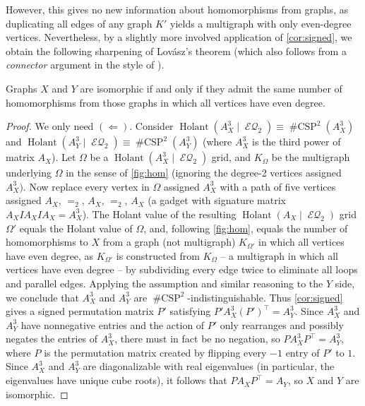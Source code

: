 \documentclass{theoretics}
\DeclareMathOperator{\holant}{Holant}
\DeclareMathOperator{\csp}{\#CSP}
\DeclareMathOperator{\eq}{\mathcal{EQ}}
\begin{document}
However, this gives no new information about homomorphisms from graphs, as
duplicating all edges of any graph $K'$ yields a multigraph with 
only even-degree vertices. Nevertheless, by a slightly more involved application of 
\autoref{cor:signed}, we obtain the following sharpening of Lovász's theorem (which also
follows from a \emph{connector} argument in the style of \cite{dvorak_recognizing_2010}).
\begin{corollary}
    Graphs $X$ and $Y$ are isomorphic if and only if they admit the same number of homomorphisms
    from those graphs in which all vertices have even degree.
\end{corollary}
\begin{proof}
    We only need $(\Longleftarrow)$. Consider
    $\holant(A_X^3 \mid \eq_2) \equiv \csp^2(A_X^3)$ and
    $\holant(A_Y^3 \mid \eq_2) \equiv \csp^2(A_Y^3)$ (where $A_X^3$ is the third power of
    matrix $A_X$). Let $\Omega$ be a
    $\holant(A_X^3 \mid \eq_2)$ grid, and $K_\Omega$ be the multigraph underlying $\Omega$ in
    the sense of \autoref{fig:hom} (ignoring the degree-2 vertices assigned $A_X^3)$.
    Now replace every vertex in $\Omega$ assigned $A_X^3$ with a path of five vertices 
    assigned $A_X$, $=_2$, $A_X$, $=_2$, $A_X$
    (a gadget with signature matrix $A_X I A_X I A_X = A_X^3$).
    The Holant value of the resulting 
    $\holant(A_X \mid \eq_2)$ grid $\Omega'$ equals the
    Holant value of $\Omega$, and, following \autoref{fig:hom}, equals the number of 
    homomorphisms to $X$ from a graph (not multigraph) $K_{\Omega'}$ in which all vertices 
    have even 
    degree, as $K_{\Omega'}$ is constructed from $K_\Omega$ -- a multigraph in which all 
    vertices have even degree -- by subdividing every edge twice to eliminate all loops
    and parallel edges. Applying the assumption and similar reasoning to
    the $Y$ side, we conclude that $A_X^3$ and $A_Y^3$ are
    $\csp^2$-indistinguishable. Thus \autoref{cor:signed} gives a signed
    permutation matrix $P'$ satisfying $P' A_X^3 (P')^\top = A_Y^3$.
    Since $A_X^3$ and $A_Y^3$ have nonnegative entries and the action of $P'$ only rearranges
    and possibly negates the entries of $A_X^3$, there must in fact be no negation, so
    $P A_X^3 P^\top = A_Y^3$,
    where $P$ is the permutation matrix created by flipping every $-1$ entry of $P'$ to $1$. 
    Since $A_X^3$ and $A_Y^3$ are diagonalizable with real eigenvalues (in particular, the
    eigenvalues have unique cube roots), it follows that 
    $P A_X P^\top = A_Y$, so $X$ and $Y$ are isomorphic.
\end{proof}
\end{document}
